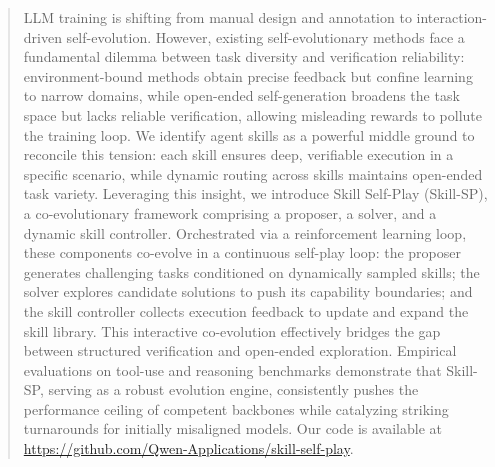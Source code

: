 \begin{abstract}
LLM training is shifting from manual design and annotation to interaction-driven self-evolution. However, existing self-evolutionary methods face a fundamental dilemma between task diversity and verification reliability: environment-bound methods obtain precise feedback but confine learning to narrow domains, while open-ended self-generation broadens the task space but lacks reliable verification, allowing misleading rewards to pollute the training loop. We identify agent skills as a powerful middle ground to reconcile this tension: each skill ensures deep, verifiable execution in a specific scenario, while dynamic routing across skills maintains open-ended task variety.
Leveraging this insight, we introduce Skill Self-Play (Skill-SP), a co-evolutionary framework comprising a proposer, a solver, and a dynamic skill controller. Orchestrated via a reinforcement learning loop, these components co-evolve in a continuous self-play loop: the proposer generates challenging tasks conditioned on dynamically sampled skills; the solver explores candidate solutions to push its capability boundaries; and the skill controller collects execution feedback to update and expand the skill library. This interactive co-evolution effectively bridges the gap between structured verification and open-ended exploration. Empirical evaluations on tool-use and reasoning benchmarks demonstrate that Skill-SP, serving as a robust evolution engine, consistently pushes the performance ceiling of competent backbones while catalyzing striking turnarounds for initially misaligned models. Our code is available at \url{https://github.com/Qwen-Applications/skill-self-play}.
\end{abstract}